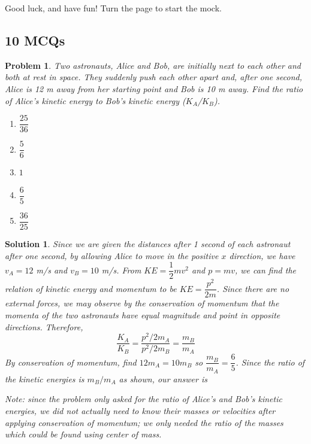 \documentclass[12pt]{article}
\newcommand{\clearpts}{\addtocounter{tpts}{\value{cpts}} \setcounter{cpts}{0}}
\newcommand{\pts}[1]{\clearpts \setcounter{cpts}{#1}}
\newtheorem*{solution}{Solution}
\theoremstyle{mystyle}
\newtheorem{pproblem}{Problem}
\begin{document}
Good luck, and have fun! Turn the page to start the mock.

\newpage

\subsection*{10 MCQs}


\pts{2}
\begin{pproblem}
    Two astronauts, Alice and Bob, are initially next to each other and both at rest in space. They suddenly push each other apart and, after one second, Alice is 12 m away from her starting point and Bob is 10 m away. Find the ratio of Alice's kinetic energy to Bob's kinetic energy ($K_A$/$K_B$).
    \begin{enumerate}[label=\Alph*)]
        \item $\dfrac{25}{36}$
        \item $\dfrac{5}{6}$
        \item $1$
        \item $\dfrac{6}{5}$
        \item $\dfrac{36}{25}$
    \end{enumerate}
\end{pproblem}
\begin{solution}
    Since we are given the distances after 1 second of each astronaut after one second, by allowing Alice to move in the positive $x$ direction, we have $v_A = 12$ m/s and  $v_B = 10$ m/s. From $KE = \dfrac{1}{2}mv^2$ and $p = mv$, we can find the relation of kinetic energy and momentum to be $KE = \dfrac{p^2}{2m}$. Since there are no external forces, we may observe by the conservation of momentum that the momenta of the two astronauts have equal magnitude and point in opposite directions. Therefore, $$\dfrac{K_A}{K_B} = \dfrac{p^2/2m_A}{p^2/2m_B} = \dfrac{m_B}{m_A}$$
    By conservation of momentum, find $12m_A = 10m_B$ so $\dfrac{m_B}{m_A} = \dfrac{6}{5}$. Since the ratio of the kinetic energies is $m_B/m_A$ as shown, our answer is 
    
    Note: since the problem only asked for the ratio of Alice's and Bob's kinetic energies, we did not actually need to know their masses or velocities after applying conservation of momentum; we only needed the ratio of the masses which could be found using center of mass. 
\end{solution}
\end{document}
